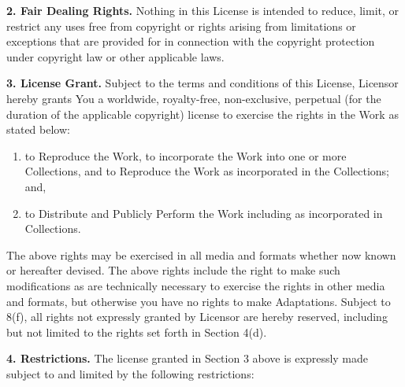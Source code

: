 \par \textbf{2. Fair Dealing Rights.} Nothing in this
License is intended to reduce, limit, or restrict any uses
free from copyright or rights arising from limitations or
exceptions that are provided for in connection with the
copyright protection under copyright law or other
applicable laws.
\par \textbf{3. License Grant.} Subject to the terms
and conditions of this License, Licensor hereby grants You
a worldwide, royalty-free, non-exclusive, perpetual (for
the duration of the applicable copyright) license to
exercise the rights in the Work as stated below:
\begin{enumerate}
\item to Reproduce the Work, to incorporate the Work into
one or more Collections, and to Reproduce the Work as
incorporated in the Collections; and,
\item to Distribute and Publicly Perform the Work including
as incorporated in Collections.
\end{enumerate}
\par The above rights may be exercised in all media and
formats whether now known or hereafter devised. The above
rights include the right to make such modifications as are
technically necessary to exercise the rights in other media
and formats, but otherwise you have no rights to make
Adaptations. Subject to 8(f), all rights not expressly
granted by Licensor are hereby reserved, including but not
limited to the rights set forth in Section 4(d).
\par \textbf{4. Restrictions.} The license granted in
Section 3 above is expressly made subject to and limited by
the following restrictions:
